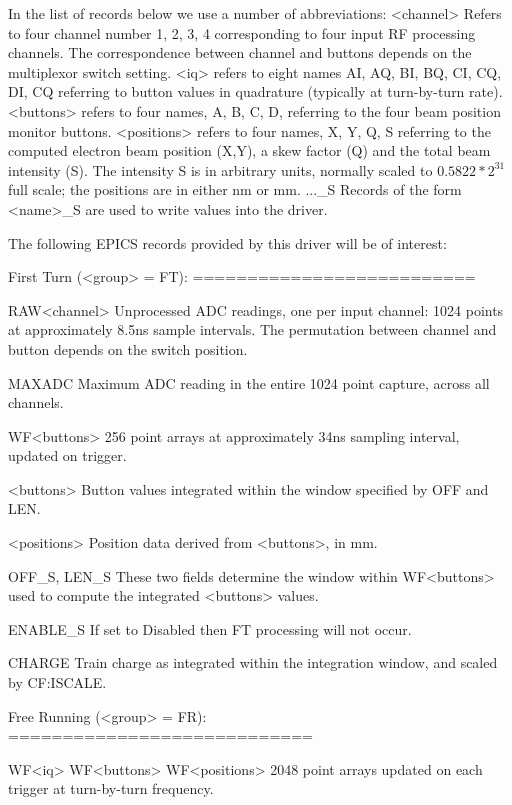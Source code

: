 \documentclass[a4paper,fleqn]{article}
\begin{document}
In the list of records below we use a number of abbreviations:
    <channel>
        Refers to four channel number 1, 2, 3, 4 corresponding to four input
        RF processing channels.  The correspondence between channel and
        buttons depends on the multiplexor switch setting.
    <iq>
        refers to eight names AI, AQ, BI, BQ, CI, CQ, DI, CQ referring to
        button values in quadrature (typically at turn-by-turn rate).
    <buttons> 
        refers to four names, A, B, C, D, referring to the four beam position
        monitor buttons.
    <positions> 
        refers to four names, X, Y, Q, S referring to the computed electron
        beam position (X,Y), a skew factor (Q) and the total beam intensity
        (S).  The intensity S is in arbitrary units, normally scaled to
        $0.5822*2^31$ full scale; the positions are in either nm or mm. 
    ...\_S
        Records of the form <name>\_S are used to write values into the driver.
        

The following EPICS records provided by this driver will be of interest:


First Turn (<group> = FT):
==========================

    RAW<channel>
        Unprocessed ADC readings, one per input channel: 1024 points at
        approximately 8.5ns sample intervals.  The permutation between channel
        and button depends on the switch position.

    MAXADC
        Maximum ADC reading in the entire 1024 point capture, across all
        channels.

    WF<buttons>
        256 point arrays at approximately 34ns sampling interval, updated on
        trigger.

    <buttons>
        Button values integrated within the window specified by OFF and LEN.

    <positions>
        Position data derived from <buttons>, in mm.

    OFF\_S, LEN\_S
        These two fields determine the window within WF<buttons> used to
        compute the integrated <buttons> values.

    ENABLE\_S
        If set to Disabled then FT processing will not occur.

    CHARGE
        Train charge as integrated within the integration window, and scaled
        by CF:ISCALE.


Free Running (<group> = FR):
============================

    WF<iq>
    WF<buttons>
    WF<positions>
        2048 point arrays updated on each trigger at turn-by-turn frequency.
\end{document}
